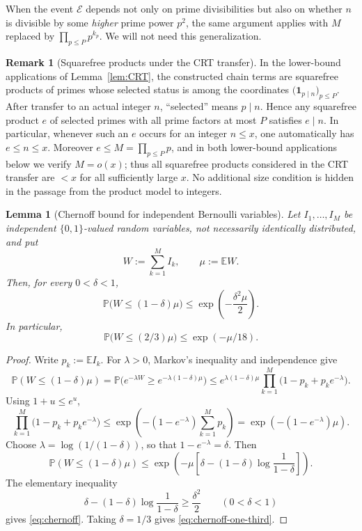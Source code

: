 \documentclass[11pt,reqno]{amsart}
\theoremstyle{plain}
\newtheorem{lemma}[theorem]{Lemma}
\theoremstyle{definition}
\newtheorem{remark}[theorem]{Remark}
\newcommand{\PP}{\mathbb{P}}
\newcommand{\EE}{\mathbb{E}}
\begin{document}
When the event $\mathcal{E}$ depends not only on prime divisibilities but also
on whether $n$ is divisible by some \emph{higher} prime power $p^2$, the same
argument applies with $M$ replaced by $\prod_{p\le P}p^{k_p}$. We will not need
this generalization.

\begin{remark}[Squarefree products under the CRT transfer]\label{rem:CRT-products}
In the lower-bound applications of Lemma~\ref{lem:CRT}, the constructed chain
terms are squarefree products of primes whose selected status is among the
coordinates $\bigl(\mathbf 1_{p\mid n}\bigr)_{p\le P}$. After transfer to an
actual integer $n$, ``selected'' means $p\mid n$. Hence any squarefree product
$e$ of selected primes with all prime factors at most $P$ satisfies $e\mid n$.
In particular, whenever such an $e$ occurs for an integer $n\le x$, one
automatically has $e\le n\le x$. Moreover $e\le M=\prod_{p\le P}p$, and in both
lower-bound applications below we verify $M=o(x)$; thus all squarefree products
considered in the CRT transfer are $<x$ for all sufficiently large $x$. No
additional size condition is hidden in the passage from the product model to
integers.
\end{remark}

\begin{lemma}[Chernoff bound for independent Bernoulli variables]\label{lem:chernoff}
Let $I_1,\ldots,I_M$ be independent $\{0,1\}$-valued random variables, not
necessarily identically distributed, and put
\[
W:=\sum_{k=1}^M I_k,\qquad \mu:=\EE W.
\]
Then, for every $0<\delta<1$,
\begin{equation}\label{eq:chernoff}
\PP\bigl(W\le (1-\delta)\mu\bigr)
\le
\exp\!\left(-\frac{\delta^2\mu}{2}\right).
\end{equation}
In particular,
\begin{equation}\label{eq:chernoff-one-third}
\PP\bigl(W\le (2/3)\mu\bigr)\le \exp(-\mu/18).
\end{equation}
\end{lemma}

\begin{proof}
Write $p_k:=\EE I_k$. For $\lambda>0$, Markov's inequality and independence give
\[
\PP(W\le (1-\delta)\mu)
=
\PP\bigl(e^{-\lambda W}\ge e^{-\lambda(1-\delta)\mu}\bigr)
\le
e^{\lambda(1-\delta)\mu}
\prod_{k=1}^M \bigl(1-p_k+p_k e^{-\lambda}\bigr).
\]
Using $1+u\le e^u$,
\[
\prod_{k=1}^M \bigl(1-p_k+p_k e^{-\lambda}\bigr)
\le
\exp\!\left(-(1-e^{-\lambda})\sum_{k=1}^M p_k\right)
=
\exp\!\left(-(1-e^{-\lambda})\mu\right).
\]
Choose $\lambda=\log(1/(1-\delta))$, so that $1-e^{-\lambda}=\delta$. Then
\[
\PP(W\le (1-\delta)\mu)
\le
\exp\!\left(
-\mu\left[\delta-(1-\delta)\log\frac1{1-\delta}\right]
\right).
\]
The elementary inequality
\[
\delta-(1-\delta)\log\frac1{1-\delta}\ge \frac{\delta^2}{2}
\qquad (0<\delta<1)
\]
gives \eqref{eq:chernoff}. Taking $\delta=1/3$ gives
\eqref{eq:chernoff-one-third}.
\end{proof}
\end{document}

